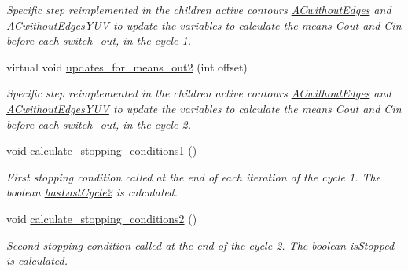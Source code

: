 \begin{DoxyCompactItemize}
\begin{DoxyCompactList}\small\item\em Specific step reimplemented in the children active contours \hyperlink{classofeli_1_1_a_cwithout_edges}{A\-Cwithout\-Edges} and \hyperlink{classofeli_1_1_a_cwithout_edges_y_u_v}{A\-Cwithout\-Edges\-Y\-U\-V} to update the variables to calculate the means {\itshape Cout} and {\itshape Cin} before each \hyperlink{classofeli_1_1_active_contour_a98af656dfc038e6f03c9e4bb67e39bd0}{switch\-\_\-out}, in the cycle 1. \end{DoxyCompactList}\item 
virtual void \hyperlink{classofeli_1_1_active_contour_a347e650493750ad29b8b73ed52bdcf7a}{updates\-\_\-for\-\_\-means\-\_\-out2} (int offset)
\begin{DoxyCompactList}\small\item\em Specific step reimplemented in the children active contours \hyperlink{classofeli_1_1_a_cwithout_edges}{A\-Cwithout\-Edges} and \hyperlink{classofeli_1_1_a_cwithout_edges_y_u_v}{A\-Cwithout\-Edges\-Y\-U\-V} to update the variables to calculate the means {\itshape Cout} and {\itshape Cin} before each \hyperlink{classofeli_1_1_active_contour_a98af656dfc038e6f03c9e4bb67e39bd0}{switch\-\_\-out}, in the cycle 2. \end{DoxyCompactList}\item 
\hypertarget{classofeli_1_1_active_contour_a7c7275006d98705cd7f04f8a7fe7e697}{void \hyperlink{classofeli_1_1_active_contour_a7c7275006d98705cd7f04f8a7fe7e697}{calculate\-\_\-stopping\-\_\-conditions1} ()}\label{classofeli_1_1_active_contour_a7c7275006d98705cd7f04f8a7fe7e697}

\begin{DoxyCompactList}\small\item\em First stopping condition called at the end of each iteration of the cycle 1. The boolean \hyperlink{classofeli_1_1_active_contour_a0da1bffb7f554ec0b87daa7a0f274d7e}{has\-Last\-Cycle2} is calculated. \end{DoxyCompactList}\item 
\hypertarget{classofeli_1_1_active_contour_a218109b08dd520c95ee7613235bb0593}{void \hyperlink{classofeli_1_1_active_contour_a218109b08dd520c95ee7613235bb0593}{calculate\-\_\-stopping\-\_\-conditions2} ()}\label{classofeli_1_1_active_contour_a218109b08dd520c95ee7613235bb0593}

\begin{DoxyCompactList}\small\item\em Second stopping condition called at the end of the cycle 2. The boolean \hyperlink{classofeli_1_1_active_contour_a610cd07a1013f1b50a5ec5a78c847a40}{is\-Stopped} is calculated. \end{DoxyCompactList}\end{DoxyCompactItemize}
